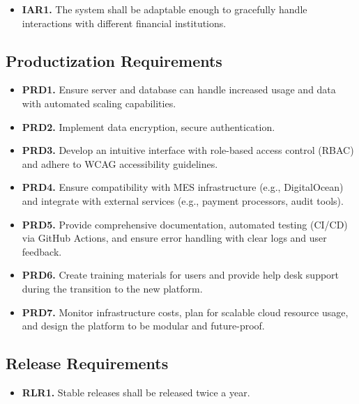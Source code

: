 \documentclass[12pt]{article}
\begin{document}
\label{IAR}

\begin{itemize}
    \item \textbf{IAR1.} The system shall be adaptable enough to gracefully handle interactions with different financial institutions.
\end{itemize}

\subsection{Productization Requirements}

\label{PRD}

\begin{itemize}
    \item \textbf{PRD1.} Ensure server and database can handle increased usage and data with automated scaling capabilities.
    \item \textbf{PRD2.} Implement data encryption, secure authentication.
    \item \textbf{PRD3.} Develop an intuitive interface with role-based access control (RBAC) and adhere to WCAG accessibility guidelines.
    \item \textbf{PRD4.} Ensure compatibility with MES infrastructure (e.g., DigitalOcean) and integrate with external services (e.g., payment processors, audit tools).
    \item \textbf{PRD5.} Provide comprehensive documentation, automated testing (CI/CD) via GitHub Actions, and ensure error handling with clear logs and user feedback.
    \item \textbf{PRD6.} Create training materials for users and provide help desk support during the transition to the new platform.
    \item \textbf{PRD7.} Monitor infrastructure costs, plan for scalable cloud resource usage, and design the platform to be modular and future-proof.
\end{itemize}

\subsection{Release Requirements}

\label{RLR}

\begin{itemize}
    \item \textbf{RLR1.} Stable releases shall be released twice a year.
\end{itemize}
\end{document}
